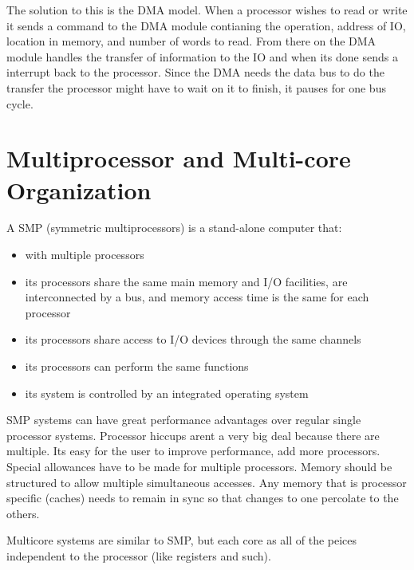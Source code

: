 \documentclass[12pt]{article}
\begin{document}
The solution to this is the DMA model. When a processor wishes to read or write it sends a command to the DMA module contianing the operation, address of IO, location in memory, and number of words to read. From there on the DMA module handles the transfer of information to the IO and when its done sends a interrupt back to the processor. Since the DMA needs the data bus to do the transfer the processor might have to wait on it to finish, it pauses for one bus cycle.

\section{Multiprocessor and Multi-core Organization}

A SMP (symmetric multiprocessors) is a stand-alone computer that:
\begin{itemize}
  \item with multiple processors
  \item its processors share the same main memory and I/O facilities, are interconnected by a bus, and memory access time is the same for each processor
  \item its processors share access to I/O devices through the same channels
  \item its processors can perform the same functions
  \item its system is controlled by an integrated operating system
\end{itemize}

SMP systems can have great performance advantages over regular single processor systems. Processor hiccups arent a very big deal because there are multiple. Its easy for the user to improve performance, add more processors. Special allowances have to be made for multiple processors. Memory should be structured to allow multiple simultaneous accesses. Any memory that is processor specific (caches) needs to remain in sync so that changes to one percolate to the others.


Multicore systems are similar to SMP, but each core as all of the peices independent to the processor (like registers and such).
\end{document}

